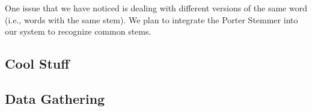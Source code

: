 \documentclass{article}
\begin{document}
One issue that we have noticed is dealing with different versions of the same word (i.e., words with the same stem).  We plan to integrate the Porter Stemmer \cite{porter} into our system to recognize common stems.


\subsection{Cool Stuff} %




\subsection{Data Gathering} %





\tocsection


\end{document}
